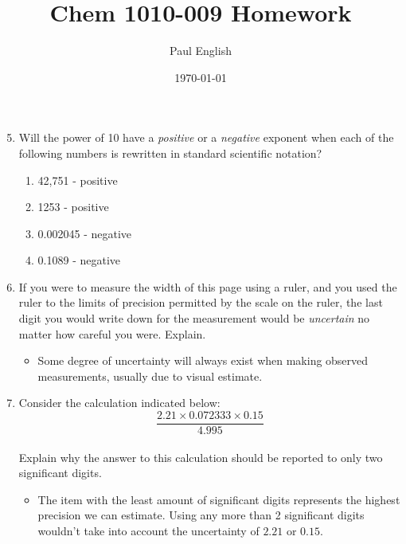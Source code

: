 \documentclass[12pt,letterpaper]{article}
\title{Chem 1010-009 Homework}
\date{\today}
\author{Paul English}
\begin{document}
\maketitle

\begin{enumerate}

\setcounter{enumi}{4} %
\item 

Will the power of 10 have a \textit{positive} or a \textit{negative} exponent when each of the following numbers is rewritten in standard scientific notation?

\begin{enumerate}
\item 42,751 - positive \\
\item 1253 - positive \\
\item 0.002045 - negative \\
\item 0.1089 - negative
\end{enumerate}

\setcounter{enumi}{28} %
\item 

If you were to measure the width of this page using a ruler, and you used the ruler to the limits of precision permitted by the scale on the ruler, the last digit you would write down for the measurement would be \textit{uncertain} no matter how careful you were. Explain. \\

\begin{itemize}
\item Some degree of uncertainty will always exist when making observed measurements, usually due to visual estimate.
\end{itemize}

\pagebreak

\setcounter{enumi}{40} %
\item 

Consider the calculation indicated below: \\
\[\frac{2.21 \times 0.072333 \times 0.15}{4.995}\] \\
Explain why the answer to this calculation should be reported to only two significant digits. \\

\begin{itemize}
\item The item with the least amount of significant digits represents the highest precision we can estimate. Using any more than 2 significant digits wouldn't take into account the uncertainty of $2.21$ or $0.15$.
\end{itemize}


\end{enumerate}
\end{document}
